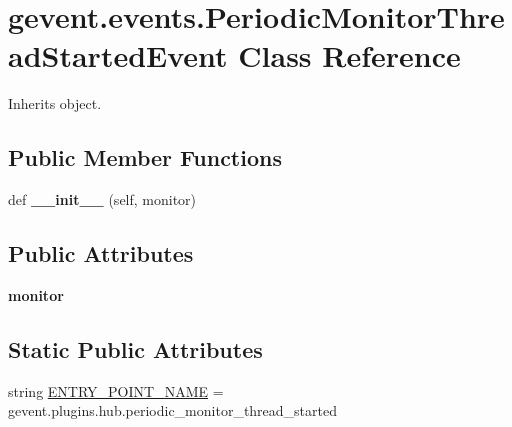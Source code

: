\hypertarget{classgevent_1_1events_1_1_periodic_monitor_thread_started_event}{}\section{gevent.\+events.\+Periodic\+Monitor\+Thread\+Started\+Event Class Reference}
\label{classgevent_1_1events_1_1_periodic_monitor_thread_started_event}


Inherits object.

\subsection*{Public Member Functions}
\begin{DoxyCompactItemize}
\item 
\mbox{\label{classgevent_1_1events_1_1_periodic_monitor_thread_started_event_a0a04537aa8c57183c1dd7dbf506344d4}} 
def {\bfseries \+\_\+\+\_\+init\+\_\+\+\_\+} (self, monitor)
\end{DoxyCompactItemize}
\subsection*{Public Attributes}
\begin{DoxyCompactItemize}
\item 
\mbox{\label{classgevent_1_1events_1_1_periodic_monitor_thread_started_event_a1041fcd02f38e72cf121d5f77a7d3242}} 
{\bfseries monitor}
\end{DoxyCompactItemize}
\subsection*{Static Public Attributes}
\begin{DoxyCompactItemize}
\item 
string \hyperlink{classgevent_1_1events_1_1_periodic_monitor_thread_started_event_a23eb56f4f3971442d5a8b5c1b24a85de}{E\+N\+T\+R\+Y\+\_\+\+P\+O\+I\+N\+T\+\_\+\+N\+A\+ME} = \textquotesingle{}gevent.\+plugins.\+hub.\+periodic\+\_\+monitor\+\_\+thread\+\_\+started\textquotesingle{}
\end{DoxyCompactItemize}


